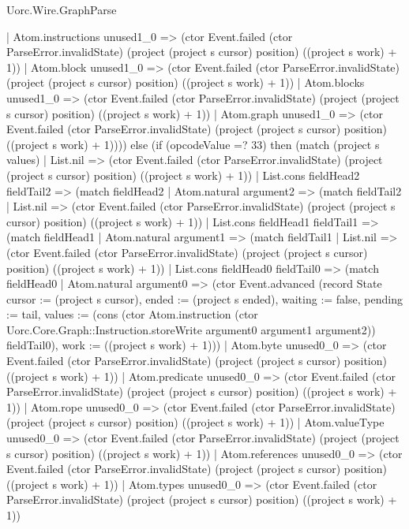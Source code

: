 \begin{lexlean}{Uorc.Wire.GraphParse}
\begin{semanticmodule}
{          | Atom.instructions unused1_0 => (ctor Event.failed (ctor ParseError.invalidState) (project (project s cursor) position) ((project s work) + 1))
          | Atom.block unused1_0 => (ctor Event.failed (ctor ParseError.invalidState) (project (project s cursor) position) ((project s work) + 1))
          | Atom.blocks unused1_0 => (ctor Event.failed (ctor ParseError.invalidState) (project (project s cursor) position) ((project s work) + 1))
          | Atom.graph unused1_0 => (ctor Event.failed (ctor ParseError.invalidState) (project (project s cursor) position) ((project s work) + 1)))) else (if (opcodeValue =? 33) then (match (project s values)
        | List.nil => (ctor Event.failed (ctor ParseError.invalidState) (project (project s cursor) position) ((project s work) + 1))
        | List.cons fieldHead2 fieldTail2 => (match fieldHead2
          | Atom.natural argument2 => (match fieldTail2
            | List.nil => (ctor Event.failed (ctor ParseError.invalidState) (project (project s cursor) position) ((project s work) + 1))
            | List.cons fieldHead1 fieldTail1 => (match fieldHead1
              | Atom.natural argument1 => (match fieldTail1
                | List.nil => (ctor Event.failed (ctor ParseError.invalidState) (project (project s cursor) position) ((project s work) + 1))
                | List.cons fieldHead0 fieldTail0 => (match fieldHead0
                  | Atom.natural argument0 => (ctor Event.advanced (record State {cursor := (project s cursor), ended := (project s ended), waiting := false, pending := tail, values := (cons (ctor Atom.instruction (ctor Uorc.Core.Graph::Instruction.storeWrite argument0 argument1 argument2)) fieldTail0), work := ((project s work) + 1)}))
                  | Atom.byte unused0_0 => (ctor Event.failed (ctor ParseError.invalidState) (project (project s cursor) position) ((project s work) + 1))
                  | Atom.predicate unused0_0 => (ctor Event.failed (ctor ParseError.invalidState) (project (project s cursor) position) ((project s work) + 1))
                  | Atom.rope unused0_0 => (ctor Event.failed (ctor ParseError.invalidState) (project (project s cursor) position) ((project s work) + 1))
                  | Atom.valueType unused0_0 => (ctor Event.failed (ctor ParseError.invalidState) (project (project s cursor) position) ((project s work) + 1))
                  | Atom.references unused0_0 => (ctor Event.failed (ctor ParseError.invalidState) (project (project s cursor) position) ((project s work) + 1))
                  | Atom.types unused0_0 => (ctor Event.failed (ctor ParseError.invalidState) (project (project s cursor) position) ((project s work) + 1))
}
\end{semanticmodule}
\end{lexlean}
